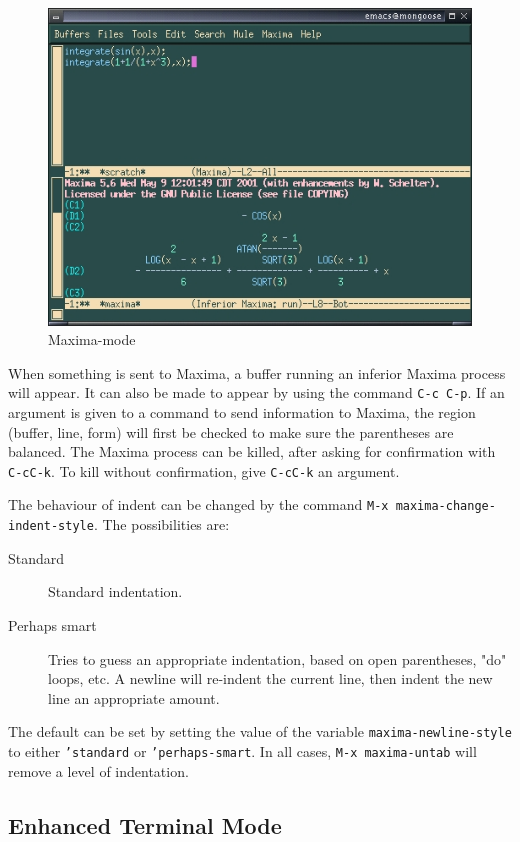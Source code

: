 \begin{figure}
\centering \includegraphics{images/emacsmaximamodeshot} 
\caption{Maxima-mode} 
\end{figure}

\noindent
When something is sent to Maxima, a buffer running an inferior Maxima 
process will appear.  It can also be made to appear by using the command
\texttt{C-c C-p}.
If an argument is given to a command to send information to Maxima,
the region (buffer, line, form) will first be checked to make sure
the parentheses are balanced.
The Maxima process can be killed, after asking for confirmation 
with \texttt{C-cC-k}.  To kill without confirmation, give \texttt{C-cC-k}
an argument.

The behaviour of indent can be changed by the command 
\texttt{M-x maxima-change-indent-style}.  The possibilities are:
\begin{description}
\item[Standard]      Standard indentation.
\item[Perhaps smart] Tries to guess an appropriate indentation, based on
               open parentheses, "do" loops, etc.
               A newline will re-indent the current line, then indent
               the new line an appropriate amount.
\end{description}
The default can be set by setting the value of the variable 
\texttt{maxima-newline-style} to either 
\texttt{'standard} or \texttt{'perhaps-smart}.
In all cases, \texttt{M-x maxima-untab} will remove a level of indentation.

\subsection{Enhanced Terminal Mode}

